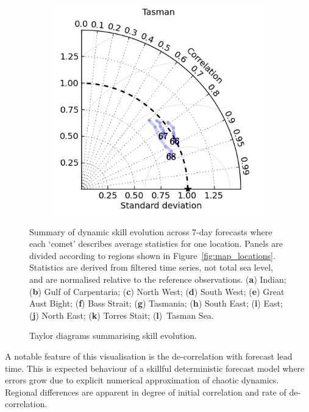 \begin{figure}[!hbt]
\begin{subfigure}{0.30\textwidth}
        \caption{}
    \end{subfigure}
    \begin{subfigure}{0.30\textwidth}
        \includegraphics[width=\textwidth]{figures/plots/taylor_diag_res_Tasman.png}
        \caption{}
    \end{subfigure}
    \caption{Taylor diagrams summarising skill evolution.}
    {Summary of dynamic skill evolution across 7-day forecasts where each `comet' describes average statistics for one location.
    Panels are divided according to regions shown in Figure~\ref{fig:map_locations}.
    Statistics are derived from filtered time series, not total sea level, and are normalised relative to the reference observations. (\textbf{a}) Indian; (\textbf{b}) Gulf of Carpentaria; (\textbf{c}) North West; (\textbf{d}) South West; (\textbf{e}) Great Aust Bight; (\textbf{f}) Bass Strait; (\textbf{g}) Tasmania; (\textbf{h}) South East; (\textbf{i}) East; (\textbf{j}) North East; (\textbf{k}) Torres Stait; (\textbf{l})~Tasman Sea. }
    \label{fig:taylors}
\end{figure}   
A notable feature of this visualisation is the de-correlation with forecast lead time.   
This is expected behaviour of a skillful deterministic forecast model where errors grow due to explicit numerical approximation of chaotic dynamics. 
Regional differences are apparent in degree of initial correlation and rate of de-correlation.

